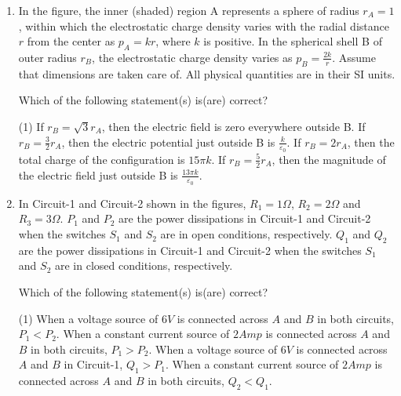 \documentclass{article}
\begin{document}
\begin{enumerate}
    \item In the figure, the inner (shaded) region A represents a sphere of radius $r_A = 1$, within which the electrostatic charge density varies with the radial distance $r$ from the center as $p_A = kr$, where $k$ is positive. In the spherical shell B of outer radius $r_B$, the electrostatic charge density varies as $p_B = \frac{2k}{r}$. Assume that dimensions are taken care of. All physical quantities are in their SI units.
    \begin{center}
        \end{center}
    Which of the following statement(s) is(are) correct?
        \begin{tasks}(1)
            \task If $r_B = \sqrt{3}r_A$, then the electric field is zero everywhere outside B.
            \task If $r_B = \frac{3}{2}r_A$, then the electric potential just outside B is $\frac{k}{\varepsilon_0}$.
            \task If $r_B = 2r_A$, then the total charge of the configuration is $15\pi k$.
            \task If $r_B = \frac{5}{2}r_A$, then the magnitude of the electric field just outside B is $\frac{13\pi k}{\varepsilon_0}$.
        \end{tasks}

    \item In Circuit-1 and Circuit-2 shown in the figures, \( R_1 = 1 \Omega \), \( R_2 = 2 \Omega \) and \( R_3 = 3 \Omega \). \( P_1 \) and \( P_2 \) are the power dissipations in Circuit-1 and Circuit-2 when the switches \( S_1 \) and \( S_2 \) are in open conditions, respectively. \( Q_1 \) and \( Q_2 \) are the power dissipations in Circuit-1 and Circuit-2 when the switches \( S_1 \) and \( S_2 \) are in closed conditions, respectively.
    \begin{center}
    \end{center}
    Which of the following statement(s) is(are) correct?
    \begin{tasks}(1)
        \task When a voltage source of \(6V\) is connected across \(A\) and \(B\) in both circuits, \(P_1 < P_2\).
        \task When a constant current source of \(2 Amp\) is connected across \(A\) and \(B\) in both circuits, \(P_1 > P_2\).
        \task When a voltage source of \(6V\) is connected across \(A\) and \(B\) in Circuit-1, \(Q_1 > P_1\).
        \task When a constant current source of \(2 Amp\) is connected across \(A\) and \(B\) in both circuits, \(Q_2 < Q_1\).
    \end{tasks}


\end{enumerate}
\end{document}
